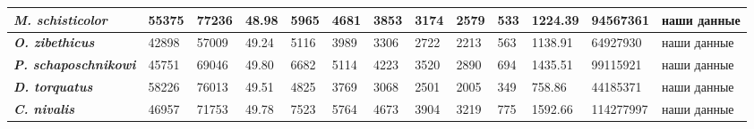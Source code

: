 \begin{landscape}
\begin{longtable}{|p{4.2cm}|p{1.5cm}|p{2.2cm}|p{1cm}|p{1cm}|p{1cm}|p{1cm}|p{1cm}|p{1cm}|p{1.5cm}|p{1.5cm}|p{2cm}|p{2.5cm}|}
				\textit{\textbf{M. schisticolor}} & 55375 & 77236 & 48.98 & 5965 & 4681 & 3853 & 3174 & 2579 & 533 & 1224.39 & 94567361 & наши данные \\ \hline
				\textit{\textbf{O. zibethicus}} & 42898 & 57009 & 49.24 & 5116 & 3989 & 3306 & 2722 & 2213 & 563 & 1138.91 & 64927930 & наши данные \\ \hline
				\textit{\textbf{P. schaposchnikowi}} & 45751 & 69046 & 49.80 & 6682 & 5114 & 4223 & 3520 & 2890 & 694 & 1435.51 & 99115921 & наши данные \\ \hline
				\textit{\textbf{D. torquatus}} & 58226 & 76013 & 49.51 & 4825 & 3769 & 3068 & 2501 & 2005 & 349 & 758.86 & 44185371 & наши данные \\ \hline
				\textit{\textbf{C. nivalis}} & 46957 & 71753 & 49.78 & 7523 & 5764 & 4673 & 3904 & 3219 & 775 & 1592.66 & 114277997 & наши данные \\ \hline		
\end{longtable}	

\end{landscape}